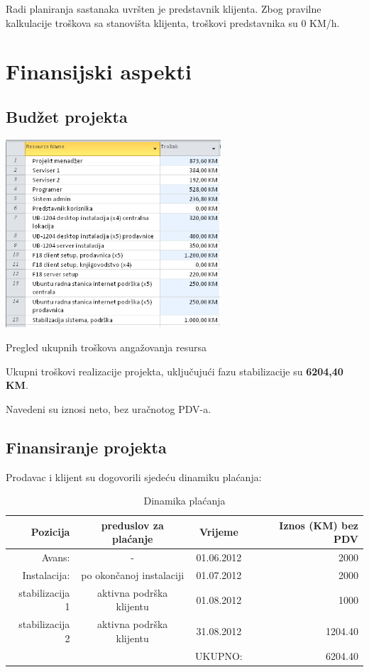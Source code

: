 \documentclass[times, utf8, seminar]{fit}
\begin{document}
Radi planiranja sastanaka uvršten je predstavnik klijenta. Zbog pravilne kalkulacije troškova sa stanovišta klijenta, troškovi predstavnika su 0 KM/h.

\pagebreak
\section{Finansijski aspekti}
\subsection{Budžet projekta}
\begin{table}[!h]
\centering
\includegraphics[height=7cm]{img/troskovi.png}
\caption{Pregled ukupnih troškova angažovanja resursa}
\end{table}

Ukupni troškovi realizacije projekta, uključujući fazu stabilizacije su \textbf{6204,40 KM}.

Navedeni su iznosi neto, bez uračnotog PDV-a.

\subsection{Finansiranje projekta}

Prodavac i klijent su dogovorili sjedeću dinamiku plaćanja:

\begin{table}[h]
\centering
\resizebox{15cm}{!} {
\begin{tabular}{ | r | c | c | r | }
\hline
Pozicija & preduslov za plaćanje & Vrijeme & Iznos (KM) bez PDV \\ \hline\hline
Avans: & - & 01.06.2012 & 2000 \\ \hline
Instalacija: & po okončanoj instalaciji & 01.07.2012 & 2000 \\ \hline
stabilizacija 1 & aktivna podrška klijentu & 01.08.2012 & 1000 \\ \hline 
stabilizacija 2 & aktivna podrška klijentu & 31.08.2012 & 1204.40 \\ \hline\hline 
                &                          &    UKUPNO: & 6204.40 \\ \hline
\end{tabular}
}
\caption{Dinamika plaćanja}
\end{table}
\end{document}
